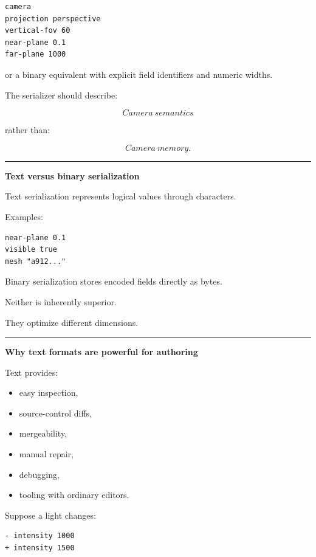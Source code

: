 \begin{verbatim}
camera
projection perspective
vertical-fov 60
near-plane 0.1
far-plane 1000
\end{verbatim}

or a binary equivalent with explicit field identifiers and numeric widths.

The serializer should describe:

\[
\boxed{
Camera\ semantics
}
\]

rather than:

\[
\boxed{
Camera\ memory.
}
\]

\begin{center}\rule{0.5\linewidth}{0.5pt}\end{center}

\textbf{Text versus binary serialization}

Text serialization represents logical values through characters.

Examples:

\begin{verbatim}
near-plane 0.1
visible true
mesh "a912..."
\end{verbatim}

Binary serialization stores encoded fields directly as bytes.

Neither is inherently superior.

They optimize different dimensions.

\begin{center}\rule{0.5\linewidth}{0.5pt}\end{center}

\textbf{Why text formats are powerful for authoring}

Text provides:

\begin{itemize}
\tightlist
\item
  easy inspection,
\item
  source-control diffs,
\item
  mergeability,
\item
  manual repair,
\item
  debugging,
\item
  tooling with ordinary editors.
\end{itemize}

Suppose a light changes:

\begin{verbatim}
- intensity 1000
+ intensity 1500
\end{verbatim}

